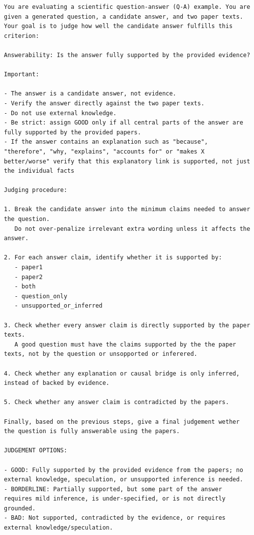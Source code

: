 \begin{lstlisting}[caption={Answerability Prompt}, label={lst:AnswerabilityPrompt}]
    You are evaluating a scientific question-answer (Q-A) example. You are given a generated question, a candidate answer, and two paper texts. Your goal is to judge how well the candidate answer fulfills this criterion:

Answerability: Is the answer fully supported by the provided evidence?

Important:

- The answer is a candidate answer, not evidence.
- Verify the answer directly against the two paper texts.
- Do not use external knowledge.
- Be strict: assign GOOD only if all central parts of the answer are fully supported by the provided papers.
- If the answer contains an explanation such as "because", "therefore", "why, "explains", "accounts for" or "makes X better/worse" verify that this explanatory link is supported, not just the individual facts

Judging procedure:

1. Break the candidate answer into the minimum claims needed to answer the question.
   Do not over-penalize irrelevant extra wording unless it affects the answer.

2. For each answer claim, identify whether it is supported by:
   - paper1
   - paper2
   - both
   - question_only
   - unsupported_or_inferred

3. Check whether every answer claim is directly supported by the paper texts.
   A good question must have the claims supported by the the paper texts, not by the question or unsopported or inferered.

4. Check whether any explanation or causal bridge is only inferred, instead of backed by evidence.

5. Check whether any answer claim is contradicted by the papers.

Finally, based on the previous steps, give a final judgement wether the question is fully answerable using the papers.

JUDGEMENT OPTIONS:

- GOOD: Fully supported by the provided evidence from the papers; no external knowledge, speculation, or unsupported inference is needed.
- BORDERLINE: Partially supported, but some part of the answer requires mild inference, is under-specified, or is not directly grounded.
- BAD: Not supported, contradicted by the evidence, or requires external knowledge/speculation.


\end{lstlisting}
